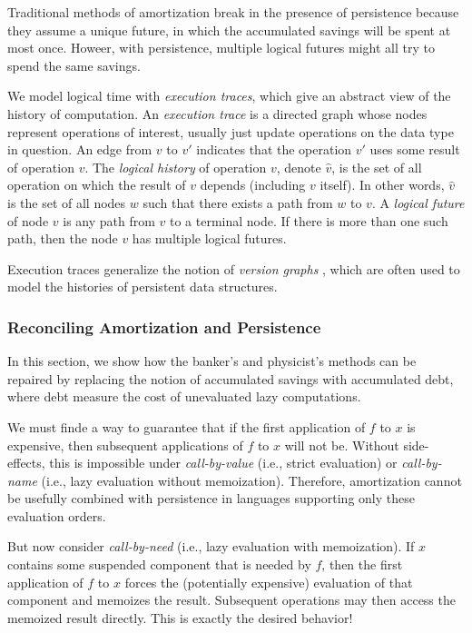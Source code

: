 \documentclass[12pt, a4paper]{article} %
\begin{document}
Traditional methods of amortization break in the presence of persistence because they assume a unique future, in which the accumulated savings will be spent at most once. Howeer, with persistence, multiple logical futures might all try to spend the same savings.

We model logical time with \textit{execution traces}, which give an abstract view of the history of computation. An \textit{execution trace} is a directed graph whose nodes represent operations of interest, usually just update operations on the data type in question. An edge from $v$ to $v'$ indicates that the operation $v'$ uses some result of operation $v$. The \textit{logical history} of operation $v$, denote $\hat{v}$, is the set of all operation on which the result of $v$ depends (including $v$ itself). In other words, $\hat{v}$ is the set of all nodes $w$ such that there exists a path from $w$ to $v$. A \textit{logical future} of node $v$ is any path from $v$ to a terminal node. If there is more than one such path, then the node $v$ has multiple logical futures.

Execution traces generalize the notion of \textit{version graphs} \cite{dsst89}, which are often used to model the histories of persistent data structures.

\subsubsection{Reconciling Amortization and Persistence}%

In this section, we show how the banker's and physicist's methods can be repaired by replacing the notion of accumulated savings with accumulated debt, where debt measure the cost of unevaluated lazy computations.

We must finde a way to guarantee that if the first application of $f$ to $x$ is expensive, then subsequent applications of $f$ to $x$ will not be. Without side-effects, this is impossible under \textit{call-by-value} (i.e., strict evaluation) or \textit{call-by-name} (i.e., lazy evaluation without memoization). Therefore, amortization cannot be usefully combined with persistence in languages supporting only these evaluation orders.

But now consider \textit{call-by-need} (i.e., lazy evaluation with memoization). If $x$ contains some suspended component that is needed by $f$, then the first application of $f$ to $x$ forces the (potentially expensive) evaluation of that component and memoizes the result. Subsequent operations may then access the memoized result directly. This is exactly the desired behavior!
\end{document}
